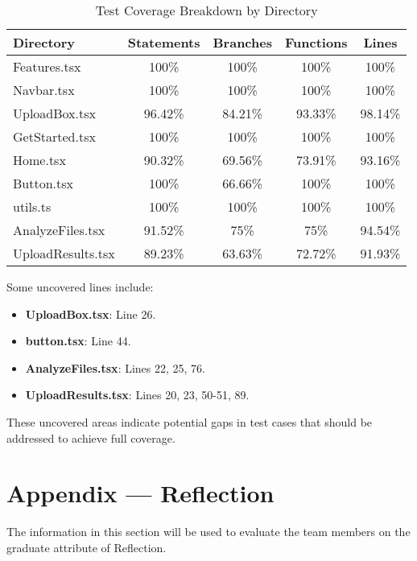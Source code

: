 \documentclass[12pt, titlepage]{article}
\begin{document}
\begin{table}[h]
    \centering
    \begin{tabular}{|l|c|c|c|c|}
    \hline
    \textbf{Directory} & \textbf{Statements} & \textbf{Branches} & \textbf{Functions} & \textbf{Lines} \\
    \hline
    Features.tsx & 100\% & 100\% & 100\% & 100\% \\
    Navbar.tsx & 100\% & 100\% & 100\% & 100\% \\
    UploadBox.tsx & 96.42\% & 84.21\% & 93.33\% & 98.14\% \\
    GetStarted.tsx & 100\% & 100\% & 100\% & 100\% \\
    Home.tsx & 90.32\% & 69.56\% & 73.91\% & 93.16\% \\
    Button.tsx & 100\% & 66.66\% & 100\% & 100\% \\
    utils.ts & 100\% & 100\% & 100\% & 100\% \\
    AnalyzeFiles.tsx & 91.52\% & 75\% & 75\% & 94.54\% \\
    UploadResults.tsx & 89.23\% & 63.63\% & 72.72\% & 91.93\% \\
    \hline
    \end{tabular}
    \caption{Test Coverage Breakdown by Directory}
    \label{tab:coverage}
\end{table}

Some uncovered lines include:

\begin{itemize}
\item \textbf{UploadBox.tsx}: Line 26.
\item \textbf{button.tsx}: Line 44.
\item \textbf{AnalyzeFiles.tsx}: Lines 22, 25, 76.
\item \textbf{UploadResults.tsx}: Lines 20, 23, 50-51, 89.
\end{itemize}

These uncovered areas indicate potential gaps in test cases that should be addressed to achieve full coverage.




\newpage{}
\section*{Appendix --- Reflection}

The information in this section will be used to evaluate the team members on the
graduate attribute of Reflection.
\end{document}
